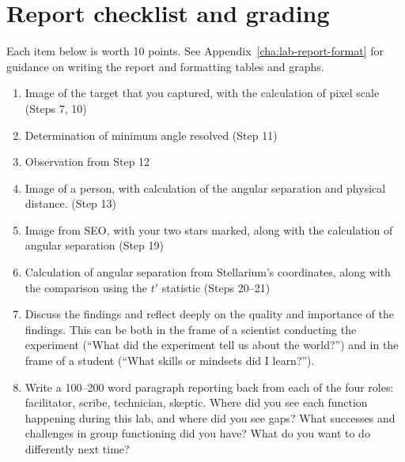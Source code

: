\section{Report checklist and grading}

Each item below is worth 10 points. See Appendix\ \ref{cha:lab-report-format} for guidance on writing the report and formatting tables and graphs.

\begin{enumerate}
	
	\item Image of the target that you captured, with the calculation of pixel scale (Steps 7, 10)
	
	\item Determination of minimum angle resolved (Step 11)
	
	\item Observation from Step 12
	
	\item Image of a person, with calculation of the angular separation and physical distance. (Step 13)
	
	\item Image from SEO, with your two stars marked, along with the calculation of angular separation (Step 19)
	
	\item Calculation of angular separation from Stellarium's coordinates, along with the comparison using the $t'$ statistic (Steps 20--21)
	
	\item Discuss the findings and reflect deeply on the quality and importance of the findings. This can
	be both in the frame of a scientist conducting the experiment (“What did the experiment tell us
	about the world?”) and in the frame of a student (“What skills or mindsets did I learn?”).
	
	\item Write a 100--200 word paragraph reporting back from each of the four roles: facilitator, scribe, technician, skeptic. Where did you see each function happening during this lab, and where did you see gaps? What successes and challenges in group functioning did you have? What do you want to do differently next time?
	
\end{enumerate}